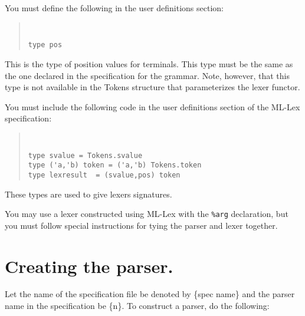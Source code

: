 You must define the following in the user definitions section:
\begin{quote}
\tt
\begin{verbatim}
type pos
\end{verbatim}
\end{quote}
This is the type of position values for terminals.  This type
must be the same as the one declared in the specification for
the grammar.  Note, however, that this type is not available
in the Tokens structure that parameterizes the lexer functor.

You must include the following code in the user definitions section of
the ML-Lex specification:
\begin{quote}
\tt
\begin{verbatim}
type svalue = Tokens.svalue
type ('a,'b) token = ('a,'b) Tokens.token
type lexresult  = (svalue,pos) token
\end{verbatim}
\end{quote}

These types are used to give lexers signatures.

You may use a lexer constructed using ML-Lex with the {\tt \%arg}
declaration, but you must follow special instructions for tying the parser
and lexer together.
 
\section{Creating the parser.}
\label{create-parser}
Let the name of the specification file be denoted by \{spec name\} and
the parser name in the specification be \{n\}.
To construct a parser, do the following:


